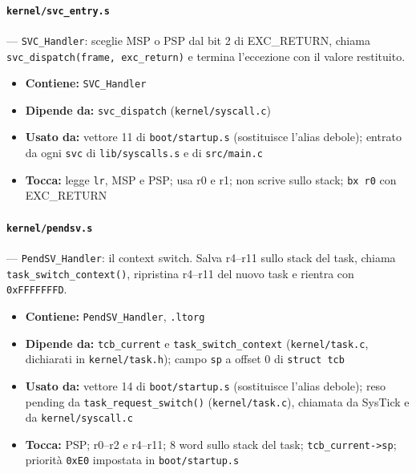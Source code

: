 \paragraph{\texttt{kernel/svc\_entry.s}} --- \texttt{SVC\_Handler}: sceglie MSP o PSP dal bit 2 di EXC\_RETURN, chiama \texttt{svc\_dispatch(frame, exc\_return)} e termina l'eccezione con il valore restituito.
\begin{itemize}
  \item \textbf{Contiene:} \texttt{SVC\_Handler}
  \item \textbf{Dipende da:} \texttt{svc\_dispatch} (\texttt{kernel/syscall.c})
  \item \textbf{Usato da:} vettore 11 di \texttt{boot/startup.s} (sostituisce l'alias debole); entrato da ogni \texttt{svc} di \texttt{lib/syscalls.s} e di \texttt{src/main.c}
  \item \textbf{Tocca:} legge \texttt{lr}, MSP e PSP; usa r0 e r1; non scrive sullo stack; \texttt{bx r0} con EXC\_RETURN
\end{itemize}

\paragraph{\texttt{kernel/pendsv.s}} --- \texttt{PendSV\_Handler}: il context switch. Salva r4--r11 sullo stack del task, chiama \texttt{task\_switch\_context()}, ripristina r4--r11 del nuovo task e rientra con \texttt{0xFFFFFFFD}.
\begin{itemize}
  \item \textbf{Contiene:} \texttt{PendSV\_Handler}, \texttt{.ltorg}
  \item \textbf{Dipende da:} \texttt{tcb\_current} e \texttt{task\_switch\_context} (\texttt{kernel/task.c}, dichiarati in \texttt{kernel/task.h}); campo \texttt{sp} a offset 0 di \texttt{struct tcb}
  \item \textbf{Usato da:} vettore 14 di \texttt{boot/startup.s} (sostituisce l'alias debole); reso pending da \texttt{task\_request\_switch()} (\texttt{kernel/task.c}), chiamata da SysTick e da \texttt{kernel/syscall.c}
  \item \textbf{Tocca:} PSP; r0--r2 e r4--r11; 8 word sullo stack del task; \texttt{tcb\_current->sp}; priorità \texttt{0xE0} impostata in \texttt{boot/startup.s}
\end{itemize}

